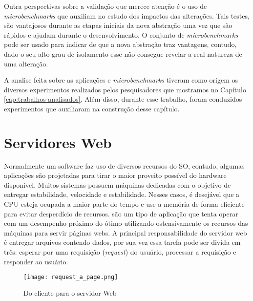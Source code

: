 Outra perspectivas sobre a validação que merece atenção é o uso de
\textit{microbenchmarks} que auxiliam no estudo dos impactos das alterações.
Tais testes, são vantajosos durante as etapas iniciais da nova abstração uma
vez que são rápidos e ajudam durante o desenvolvimento. O conjunto de
\textit{microbenchmarks} pode ser usado para indicar de que a nova abstração
traz vantagens, contudo, dado o seu alto grau de isolamento esse não consegue
revelar a real natureza de uma alteração.

A analise feita sobre as aplicações e \textit{microbenchmarks} tiveram como
origem os diversos experimentos realizados pelos pesquisadores que mostramos no
Capítulo \ref{cap:trabalhos-analisados}. Além disso, durante esse trabalho,
foram conduzidos experimentos que auxiliaram na construção desse capítulo.

\section{Servidores Web}


Normalmente um software faz uso de diversos recursos do SO, contudo, algumas
aplicações são projetadas para tirar o maior proveito possível do hardware
disponível. Muitos sistemas possuem máquinas dedicadas com o objetivo de
entregar estabilidade, velocidade e estabilidade. Nesses casos, é desejável que
a CPU esteja ocupada a maior parte do tempo e use a memória de forma eficiente
para evitar desperdício de recursos.  são um tipo de aplicação que tenta operar com um desempenho próximo
do ótimo utilizando ostensivamente os recursos das máquinas para servir páginas
webs. A principal responsabilidade do servidor web é entregar arquivos contendo
dados, por sua vez essa tarefa pode ser divida em três: esperar por uma
requisição (\textit{request}) do usuário, processar a requisição e responder ao
usuário.

\begin{figure}[!h]
  \centering
  \texttt{[image: request\_a\_page.png]}
  \caption{Do cliente para o servidor Web}
  \label{fig:client_to_web_server}
\end{figure}

